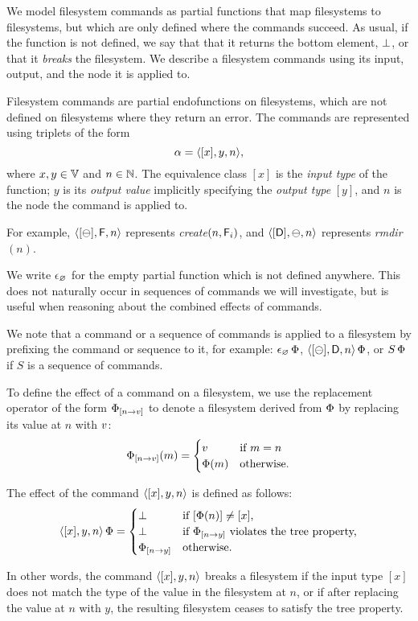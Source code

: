
We model filesystem commands as partial functions 
that map filesystems to filesystems, but which
are only defined where the commands succeed.
As usual, if the function is not defined, we say that that it returns the bottom element, $\bot$,
or that it \emph{breaks} the filesystem.
We describe a filesystem commands using its input, output, and
the node it is applied to.

\begin{mydef}
Filesystem commands are partial endofunctions on filesystems,
which are not defined on filesystems where they return an error.
The commands are represented using triplets of the form
\[ \alpha = \langle{[x],y,n}\rangle, \]
where $x,y\in\mathbb{V}$ and $n\in\mathbb{N}$.
The equivalence class $[x]$ is the \emph{input type} of the function;
$y$ is its \emph{output value} implicitly specifying the \emph{output type} $[y]$,
and $n$ is the node the command is applied to.
\end{mydef}
For example, $\langle{[\ominus],\mathsf{F},n}\rangle$ represents \textit{create}$(n,\mathsf{F}_i)$,
and $\langle{[\mathsf{D}],\ominus,n}\rangle$ represents \textit{rmdir}$(n)$.

We write $\epsilon_\varnothing$ for the empty partial function which is not defined anywhere.
This does not naturally occur in sequences of commands we will investigate,
but is useful when reasoning about the combined effects of commands.

We note that a command or a sequence of commands is applied to a filesystem
by prefixing the command or sequence to it, for example: $\epsilon_\varnothing\,\Phi$, $\langle{[\ominus],\mathsf{D},n}\rangle\,\Phi$, 
or $S\,\Phi$ if $S$ is a sequence of commands.

To define the effect of a command on a filesystem, we use
the replacement operator of the form
${\Phi}_{[{n}\rightarrow{v}]}$ to denote a filesystem derived from $\Phi$ 
by replacing its value at $n$ with $v$:
\[ {\Phi}_{[{n}\rightarrow{v}]}(m) =
   \begin{cases}
   v &\textrm{if~} m=n\\
   \Phi(m) &\textrm{otherwise.}
   \end{cases}
\]

\begin{mydef}
The effect of the command $\langle{[x],y,n}\rangle$ is defined as follows:
\[
\langle{[x],y,n}\rangle\,\Phi = 
   \begin{cases}
   \bot &\textrm{if $[\Phi(n)]\neq[x]$,}\\
   \bot &\textrm{if ${\Phi}_{[{n}\rightarrow{y}]}$ violates the tree property,}\\
   {\Phi}_{[{n}\rightarrow{y}]} &\textrm{otherwise.}
   \end{cases}
\]
\end{mydef}
In other words, the command $\langle{[x],y,n}\rangle$ breaks a filesystem if the input type $[x]$
does not match the type of the value in the filesystem at $n$, or if after replacing
the value at $n$ with $y$, the resulting filesystem ceases to satisfy the tree property.

